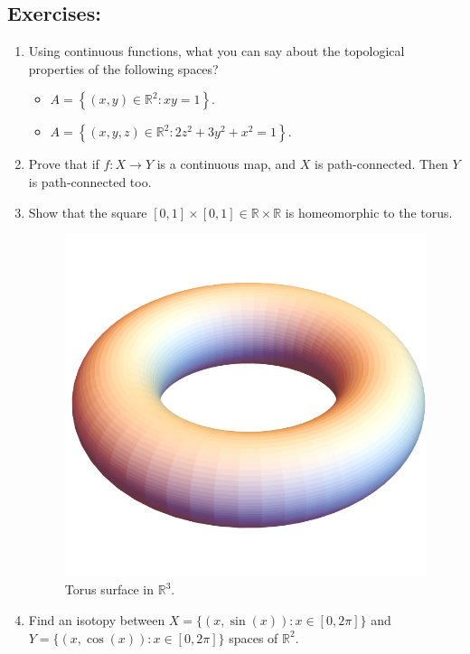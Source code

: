 \documentclass[
	fontsize=10pt, %
	twoside=false, %
	secnumdepth=1, %
]{kaobook}
\begin{document}
\subsection{Exercises:}

\begin{enumerate}

\item Using continuous functions, what you can say about the topological properties of the following spaces?
\begin{itemize}
\item $A=\left\{(x,y)\in\mathbb{R}^2: xy=1\right\}.$
\item $A=\left\{(x,y,z)\in\mathbb{R}^2: 2z^2+3y^2+x^2=1\right\}.$
\end{itemize}

\item Prove that if $f:X\to Y$ is a continuous map, and $X$ is path-connected. Then $Y$ is path-connected too.

\item Show that the square $[0,1]\times[0,1]\in \mathbb{R}\times\mathbb{R}$ is homeomorphic to the torus.

\begin{figure}[h]
\includegraphics[scale=0.1]{Torus.png}
\caption{Torus surface in $\mathbb{R}^3.$}
\end{figure}


\item Find an isotopy between $X=\{(x,\sin(x)): x\in[0,2\pi]\}$ and $Y=\{(x,\cos(x)):x\in[0,2\pi]\}$ spaces of $\mathbb{R}^2.$


\end{enumerate}
\end{document}
